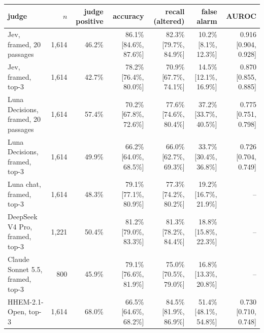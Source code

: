 \begin{tabular}{lrrrrrr}
\toprule
judge & $n$ & judge positive & accuracy & recall (altered) & false alarm & AUROC \\
\midrule
Jev, framed, 20 passages & 1,614 & 46.2\% & 86.1\% [84.6\%, 87.6\%] & 82.3\% [79.7\%, 84.9\%] & 10.2\% [8.1\%, 12.3\%] & 0.916 [0.904, 0.928] \\
Jev, framed, top-3 & 1,614 & 42.7\% & 78.2\% [76.4\%, 80.0\%] & 70.9\% [67.7\%, 74.1\%] & 14.5\% [12.1\%, 16.9\%] & 0.870 [0.855, 0.885] \\
Luna Decisions, framed, 20 passages & 1,614 & 57.4\% & 70.2\% [67.8\%, 72.6\%] & 77.6\% [74.6\%, 80.4\%] & 37.2\% [33.7\%, 40.5\%] & 0.775 [0.751, 0.798] \\
Luna Decisions, framed, top-3 & 1,614 & 49.9\% & 66.2\% [64.0\%, 68.5\%] & 66.0\% [62.7\%, 69.3\%] & 33.7\% [30.4\%, 36.8\%] & 0.726 [0.704, 0.749] \\
Luna chat, framed, top-3 & 1,614 & 48.3\% & 79.1\% [77.1\%, 80.9\%] & 77.3\% [74.2\%, 80.2\%] & 19.2\% [16.7\%, 21.9\%] & -- \\
DeepSeek V4 Pro, framed, top-3 & 1,221 & 50.4\% & 81.2\% [79.0\%, 83.3\%] & 81.3\% [78.2\%, 84.4\%] & 18.8\% [15.8\%, 22.3\%] & -- \\
Claude Sonnet 5.5, framed, top-3 & 800 & 45.9\% & 79.1\% [76.6\%, 81.9\%] & 75.0\% [70.5\%, 79.0\%] & 16.8\% [13.3\%, 20.8\%] & -- \\
HHEM-2.1-Open, top-3 & 1,614 & 68.0\% & 66.5\% [64.6\%, 68.2\%] & 84.5\% [81.9\%, 86.9\%] & 51.4\% [48.1\%, 54.8\%] & 0.730 [0.710, 0.748] \\
\bottomrule
\end{tabular}
